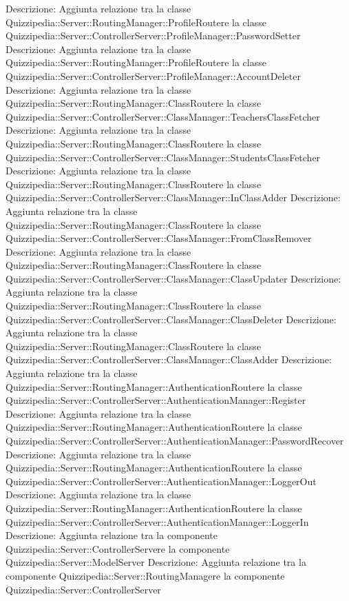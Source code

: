 Descrizione: Aggiunta relazione tra la classe Quizzipedia::Server::RoutingManager::ProfileRoutere la classe Quizzipedia::Server::ControllerServer::ProfileManager::PasswordSetter 
Descrizione: Aggiunta relazione tra la classe Quizzipedia::Server::RoutingManager::ProfileRoutere la classe Quizzipedia::Server::ControllerServer::ProfileManager::AccountDeleter 
Descrizione: Aggiunta relazione tra la classe Quizzipedia::Server::RoutingManager::ClassRoutere la classe Quizzipedia::Server::ControllerServer::ClassManager::TeachersClassFetcher 
Descrizione: Aggiunta relazione tra la classe Quizzipedia::Server::RoutingManager::ClassRoutere la classe Quizzipedia::Server::ControllerServer::ClassManager::StudentsClassFetcher 
Descrizione: Aggiunta relazione tra la classe Quizzipedia::Server::RoutingManager::ClassRoutere la classe Quizzipedia::Server::ControllerServer::ClassManager::InClassAdder 
Descrizione: Aggiunta relazione tra la classe Quizzipedia::Server::RoutingManager::ClassRoutere la classe Quizzipedia::Server::ControllerServer::ClassManager::FromClassRemover 
Descrizione: Aggiunta relazione tra la classe Quizzipedia::Server::RoutingManager::ClassRoutere la classe Quizzipedia::Server::ControllerServer::ClassManager::ClassUpdater 
Descrizione: Aggiunta relazione tra la classe Quizzipedia::Server::RoutingManager::ClassRoutere la classe Quizzipedia::Server::ControllerServer::ClassManager::ClassDeleter 
Descrizione: Aggiunta relazione tra la classe Quizzipedia::Server::RoutingManager::ClassRoutere la classe Quizzipedia::Server::ControllerServer::ClassManager::ClassAdder 
Descrizione: Aggiunta relazione tra la classe Quizzipedia::Server::RoutingManager::AuthenticationRoutere la classe Quizzipedia::Server::ControllerServer::AuthenticationManager::Register 
Descrizione: Aggiunta relazione tra la classe Quizzipedia::Server::RoutingManager::AuthenticationRoutere la classe Quizzipedia::Server::ControllerServer::AuthenticationManager::PasswordRecover 
Descrizione: Aggiunta relazione tra la classe Quizzipedia::Server::RoutingManager::AuthenticationRoutere la classe Quizzipedia::Server::ControllerServer::AuthenticationManager::LoggerOut 
Descrizione: Aggiunta relazione tra la classe Quizzipedia::Server::RoutingManager::AuthenticationRoutere la classe Quizzipedia::Server::ControllerServer::AuthenticationManager::LoggerIn 
Descrizione: Aggiunta relazione tra la componente Quizzipedia::Server::ControllerServere la componente Quizzipedia::Server::ModelServer 
Descrizione: Aggiunta relazione tra la componente Quizzipedia::Server::RoutingManagere la componente Quizzipedia::Server::ControllerServer 
